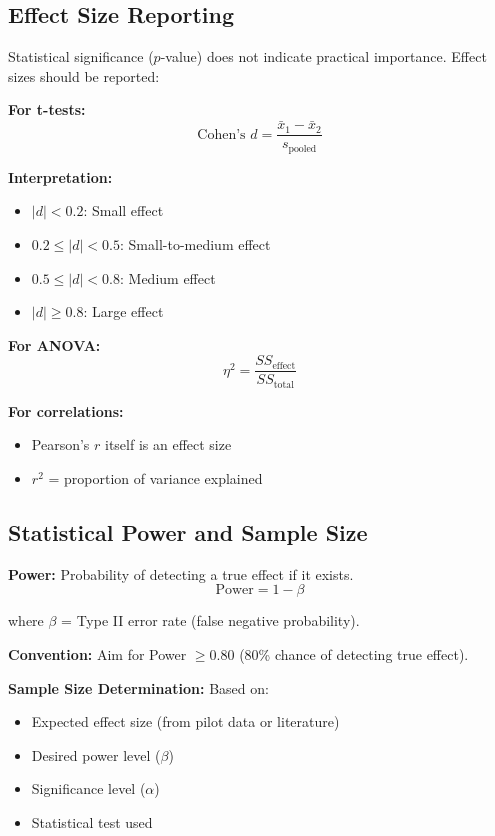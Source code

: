 \documentclass[12pt,a4paper]{article}
\begin{document}
\subsection{Effect Size Reporting}

Statistical significance ($p$-value) does not indicate practical importance. Effect sizes should be reported:

\textbf{For t-tests:}
\begin{equation}
\text{Cohen's } d = \frac{\bar{x}_1 - \bar{x}_2}{s_{\text{pooled}}}
\end{equation}

\textbf{Interpretation:}
\begin{itemize}
    \item $|d| < 0.2$: Small effect
    \item $0.2 \leq |d| < 0.5$: Small-to-medium effect
    \item $0.5 \leq |d| < 0.8$: Medium effect
    \item $|d| \geq 0.8$: Large effect
\end{itemize}

\textbf{For ANOVA:}
\begin{equation}
\eta^2 = \frac{SS_{\text{effect}}}{SS_{\text{total}}}
\end{equation}

\textbf{For correlations:}
\begin{itemize}
    \item Pearson's $r$ itself is an effect size
    \item $r^2$ = proportion of variance explained
\end{itemize}

\subsection{Statistical Power and Sample Size}

\textbf{Power:} Probability of detecting a true effect if it exists.
\begin{equation}
\text{Power} = 1 - \beta
\end{equation}

where $\beta$ = Type II error rate (false negative probability).

\textbf{Convention:} Aim for Power $\geq 0.80$ (80\% chance of detecting true effect).

\textbf{Sample Size Determination:} Based on:
\begin{itemize}
    \item Expected effect size (from pilot data or literature)
    \item Desired power level ($\beta$)
    \item Significance level ($\alpha$)
    \item Statistical test used
\end{itemize}
\end{document}
